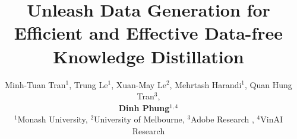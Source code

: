 \documentclass{article} %
\title{Unleash Data Generation for Efficient and Effective Data-free Knowledge Distillation}
\author{Minh-Tuan Tran$^1$, Trung Le$^1$, Xuan-May Le$^2$, Mehrtash Harandi$^1$, Quan Hung Tran$^3$,\\ \textbf{Dinh Phung$^{1,4}$} \\
$^1$Monash University,  $^2$University of Melbourne, $^3$Adobe Research , $^4$VinAI Research
}
\begin{document}
\maketitle

\begin{abstract}



\end{abstract}
\end{document}
